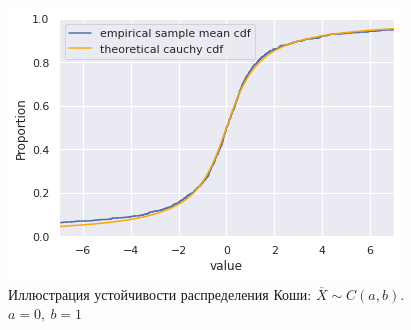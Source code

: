 \begin{figure}[ht]
	\centering
	\includegraphics[width = 0.7\linewidth]{"./resources/sample_mean_cauchy_cdf.png"}
	\caption{Иллюстрация устойчивости распределения Коши: $ \overline{X} \sim C(a, b) $. 
	 $ a = 0,\ b = 1 $}
    \label{fig:sample_mean_cauchy_cdf}
\end{figure}